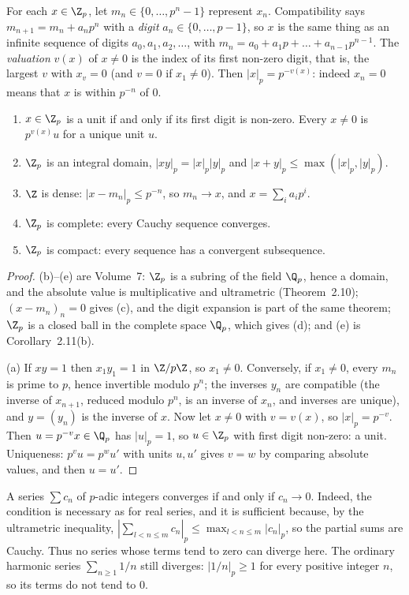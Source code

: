 For each $x\in\Z_p$, let $m_n\in\{0,\dots,p^n-1\}$ represent $x_n$. Compatibility says $m_{n+1}=m_n+a_np^n$ with a \emph{digit}
$a_n\in\{0,\dots,p-1\}$, so $x$ is the same thing as an infinite sequence of digits $a_0,a_1,a_2,\dots$, with
$m_n=a_0+a_1p+\dots+a_{n-1}p^{n-1}$. The \emph{valuation} $v(x)$ of $x\ne0$ is the index of its first non-zero digit, that is,
the largest $v$ with $x_v=0$ (and $v=0$ if $x_1\ne0$). Then $|x|_p=p^{-v(x)}$: indeed $x_n=0$ means that $x$ is within
$p^{-n}$ of $0$.

\begin{proposition}\label{prop:Zp}
\begin{enumerate}[label=(\alph*)]
\item $x\in\Z_p$ is a unit if and only if its first digit is non-zero. Every $x\ne0$ is $p^{v(x)}u$ for a unique unit $u$.
\item $\Z_p$ is an integral domain, $|xy|_p=|x|_p|y|_p$ and $|x+y|_p\le\max(|x|_p,|y|_p)$.
\item $\Z$ is dense: $|x-m_n|_p\le p^{-n}$, so $m_n\to x$, and $x=\sum_ia_ip^i$.
\item $\Z_p$ is complete: every Cauchy sequence converges.
\item $\Z_p$ is compact: every sequence has a convergent subsequence.
\end{enumerate}
\end{proposition}
\begin{proof}
(b)--(e) are Volume~7: $\Z_p$ is a subring of the field $\Q_p$, hence a domain, and the absolute value is multiplicative and
ultrametric (Theorem~2.10); $(x-m_n)_n=0$ gives (c), and the digit expansion is part of the same theorem; $\Z_p$ is a closed
ball in the complete space $\Q_p$, which gives (d); and (e) is Corollary~2.11(b).

(a) If $xy=1$ then $x_1y_1=1$ in $\Z/p\Z$, so $x_1\ne0$. Conversely, if $x_1\ne0$, every $m_n$ is prime to $p$, hence
invertible modulo $p^n$; the inverses $y_n$ are compatible (the inverse of $x_{n+1}$, reduced modulo $p^n$, is an inverse of
$x_n$, and inverses are unique), and $y=(y_n)$ is the inverse of $x$. Now let $x\ne0$ with $v=v(x)$, so $|x|_p=p^{-v}$. Then
$u=p^{-v}x\in\Q_p$ has $|u|_p=1$, so $u\in\Z_p$ with first digit non-zero: a unit. Uniqueness: $p^vu=p^wu'$ with units $u,u'$
gives $v=w$ by comparing absolute values, and then $u=u'$.
\end{proof}

A series $\sum c_n$ of $p$-adic integers converges if and only if $c_n\to0$. Indeed, the condition is necessary as for real
series, and it is sufficient because, by the ultrametric inequality, $\left|\sum_{l<n\le m}c_n\right|_p\le\max_{l<n\le m}|c_n|_p$, so
the partial sums are Cauchy. Thus no series whose terms tend to zero can diverge here. The ordinary harmonic series
$\sum_{n\ge1}1/n$ still diverges: $|1/n|_p\ge1$ for every positive integer $n$, so its terms do not tend to $0$.

